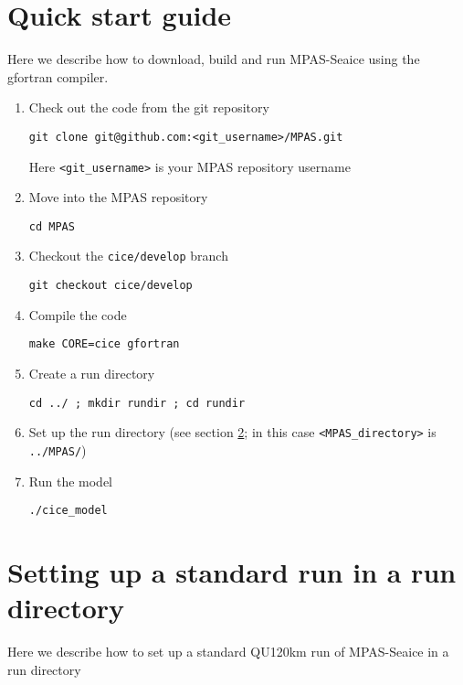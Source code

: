 \documentclass{article}
\begin{document}
\section{Quick start guide}
\label{sec:quick_start_guide}

Here we describe how to download, build and run MPAS-Seaice using the gfortran compiler.

\begin{enumerate}

\item Check out the code from the git repository

\verb+git clone git@github.com:<git_username>/MPAS.git+

Here \verb+<git_username>+ is your MPAS repository username

\item Move into the MPAS repository

\verb+cd MPAS+

\item Checkout the \verb+cice/develop+ branch

\verb+git checkout cice/develop+

\item Compile the code

\verb+make CORE=cice gfortran+

\item Create a run directory

\verb+cd ../ ; mkdir rundir ; cd rundir+

\item Set up the run directory (see section \ref{sec:standard_run}; in this case \verb+<MPAS_directory>+ is \verb+../MPAS/+) 

\item Run the model

\verb+./cice_model+

\end{enumerate}


\section{Setting up a standard run in a run directory}
\label{sec:standard_run}

Here we describe how to set up a standard QU120km run of MPAS-Seaice in a run directory
\end{document}
